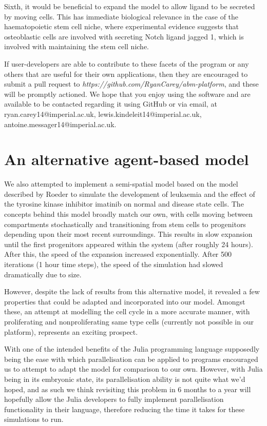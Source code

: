\documentclass[11.5pt]{article}
\begin{document}
Sixth, it would be beneficial to expand the model to allow ligand to be 
secreted by moving cells. This has immediate biological relevance in the 
case of the haematopoietic stem cell niche, where experimental evidence 
suggests that osteoblastic cells are involved with secreting Notch 
ligand jagged 1, which is involved with maintaining the stem cell niche.
\cite{}

If user-developers are able to contribute to these facets of the program 
or any others that are useful for their own applications, then they are 
encouraged to submit a pull request to {\itshape 
https://github.com/RyanCarey/abm-platform}, and these will be
promptly actioned. We hope that you enjoy using the software 
and are available to be contacted regarding it using GitHub or via 
email, at ryan.carey14@imperial.ac.uk, 
lewis.kindeleit14@imperial.ac.uk, 
antoine.messager14@imperial.ac.uk.

\newpage

\section{An alternative agent-based model}

We also attempted to implement a semi-spatial model based on the model 
described by Roeder to simulate the development of leukaemia and the 
effect of the tyrosine kinase inhibitor imatinib on normal and disease 
state cells. The concepts behind this model broadly match our own, with 
cells moving between compartments stochastically and transitioning from 
stem cells to progenitors depending upon their most recent surroundings. 
This results in slow expansion until the first progenitors appeared 
within the system (after roughly 24 hours). After this, the speed of the 
expansion increased exponentially. After 500 iterations (1 hour time 
steps), the speed of the simulation had slowed dramatically due to size.

However, despite the lack of results from this alternative model, it 
revealed a few properties that could be adapted and incorporated into 
our model. Amongst these, an attempt at modelling the cell cycle in a 
more accurate manner, with proliferating and nonproliferating same type 
cells (currently not possible in our platform), represents an exciting 
prospect.

With one of the intended benefits of the Julia programming language 
supposedly being the ease with which parallelisation can be applied to 
programs encouraged us to attempt to adapt the model for comparison to 
our own. However, with Julia being in its embryonic state, its 
parallelisation ability is not quite what we'd hoped, and as such we 
think revisiting this problem in 6 months to a year will hopefully allow 
the Julia developers to fully implement parallelisation functionality in 
their language, therefore reducing the time it takes for these 
simulations to run.
\end{document}
